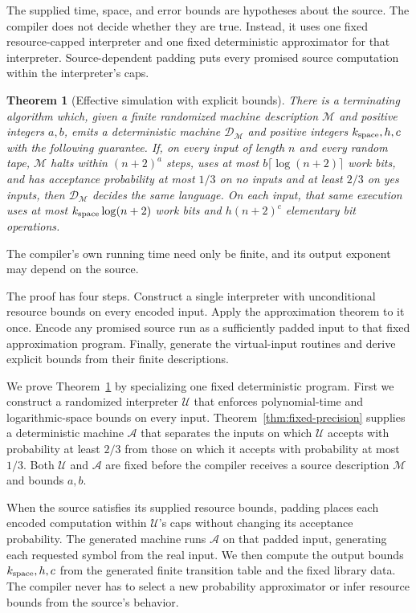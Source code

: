 \documentclass[11pt]{article}
\numberwithin{equation}{section}
\newtheorem{theorem}{Theorem}[section]
\theoremstyle{definition}
\theoremstyle{remark}
\begin{document}
The supplied time, space, and error bounds are hypotheses about the source. The compiler does not decide whether they are true. Instead, it uses one fixed resource-capped interpreter and one fixed deterministic approximator for that interpreter. Source-dependent padding puts every promised source computation within the interpreter's caps.

\begin{theorem}[Effective simulation with explicit bounds]
\label{thm:effective-simulation}
There is a terminating algorithm which, given a finite randomized machine
description ${\mathcal{M}}$ and positive integers $a,b$, emits a deterministic
machine ${\mathcal{D}}_{\mathcal{M}}$ and positive integers ${k_{\rm space}},{h},c$ with the following guarantee.
If, on every input of length $n$ and every random tape, ${\mathcal{M}}$ halts within
$(n+2)^a$ steps, uses at most $b\lceil\log(n+2)\rceil$ work bits, and
has acceptance probability at most $1/3$ on no inputs and at least
$2/3$ on yes inputs, then ${\mathcal{D}}_{\mathcal{M}}$ decides the same language. On each input,
that same execution uses at most ${k_{\rm space}}\log(n+2)$ work bits and
${h}(n+2)^c$ elementary bit operations.
\end{theorem}

The compiler's own running time need only be finite, and its output
exponent may depend on the source.

The proof has four steps. Construct a single interpreter with unconditional resource bounds on every encoded input. Apply the approximation theorem to it once. Encode any promised source run as a sufficiently padded input to that fixed approximation program. Finally, generate the virtual-input routines and derive explicit bounds from their finite descriptions.

We prove Theorem~\ref{thm:effective-simulation} by specializing one fixed deterministic program. First we construct a randomized interpreter
${\mathcal{U}}$ that enforces polynomial-time and logarithmic-space bounds on every
input. Theorem~\ref{thm:fixed-precision} supplies a deterministic machine
${\mathcal{A}}$ that separates the inputs on which ${\mathcal{U}}$ accepts with probability at
least $2/3$ from those on which it accepts with probability at most
$1/3$. Both ${\mathcal{U}}$ and ${\mathcal{A}}$ are fixed before the compiler receives a source
description ${\mathcal{M}}$ and bounds $a,b$.

When the source satisfies its supplied resource bounds, padding places
each encoded computation within ${\mathcal{U}}$'s caps without changing its
acceptance probability. The generated machine runs ${\mathcal{A}}$ on that padded input, generating each requested
symbol from the real input. We then compute the output bounds ${k_{\rm space}},{h},c$
from the generated finite transition table and the fixed library data.
The compiler never has to select a new probability approximator or infer
resource bounds from the source's behavior.
\end{document}
